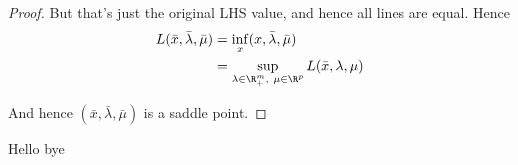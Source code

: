 \begin{proof}
	But that's just the original LHS value, and hence all lines are
	equal. Hence
	\begin{align*}
		L(\bar x,\bar\lambda,\bar\mu)
		 & =\inf_{x} (x,\bar\lambda,\bar\mu)                          \\
		 & =\sup_{\lambda\in\R^m_+,\ \mu\in\R^p}L(\bar x,\lambda,\mu) \\
	\end{align*}

  And hence $(\bar x,\bar\lambda,\bar\mu)$ is a saddle point.
\end{proof}

Hello bye

